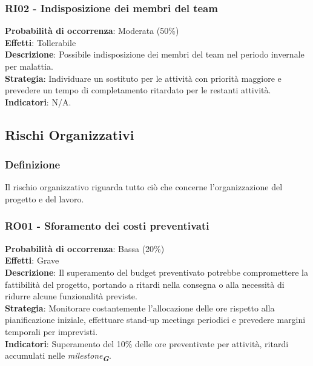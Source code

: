 \documentclass[a4paper,12pt]{article}
\newcommand{\glossario}[1]{\textit{#1}\textsubscript{\textbf{\textit{\textcolor{lightblack}{G}}}}}
\begin{document}
\subsubsection{RI02 - Indisposizione dei membri del team}
\label{RI02}
\textbf{Probabilità di occorrenza}: Moderata (50\%)\\
\textbf{Effetti}: Tollerabile\\
\textbf{Descrizione}: Possibile indisposizione dei membri del team nel periodo invernale per malattia.\\
\textbf{Strategia}: Individuare un sostituto per le attività con priorità maggiore e prevedere un tempo di completamento ritardato per le restanti attività.\\
\textbf{Indicatori}: N/A.





\subsection{Rischi Organizzativi}

\subsubsection{Definizione}
Il rischio organizzativo riguarda tutto ciò che concerne l'organizzazione del progetto e del lavoro.

\subsubsection{RO01 - Sforamento dei costi preventivati}
\label{RO01}
\textbf{Probabilità di occorrenza}: Bassa (20\%)\\
\textbf{Effetti}: Grave\\
\textbf{Descrizione}: Il superamento del budget preventivato potrebbe compromettere la fattibilità del progetto, portando a ritardi nella consegna o alla necessità di ridurre alcune funzionalità previste.\\
\textbf{Strategia}: Monitorare costantemente l'allocazione delle ore rispetto alla pianificazione iniziale, effettuare stand-up meetings periodici e prevedere margini temporali per imprevisti.\\
\textbf{Indicatori}: Superamento del 10\% delle ore preventivate per attività, ritardi accumulati nelle \glossario{milestone}.
\end{document}

